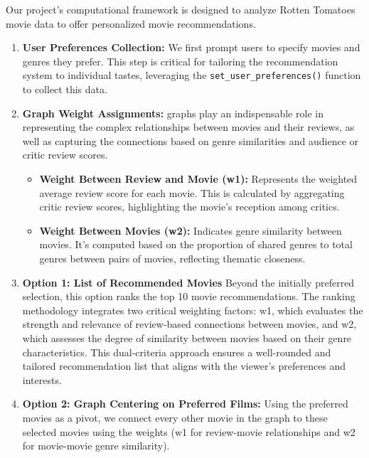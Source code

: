 \documentclass[fontsize=11pt]{article}
\begin{document}
Our project's computational framework is designed to analyze Rotten Tomatoes movie data to offer personalized movie recommendations.

\begin{enumerate}
    \item \textbf{User Preferences Collection:} We first prompt users to specify movies and genres they prefer. This step is critical for tailoring the recommendation system to individual tastes, leveraging the \texttt{set\_user\_preferences()} function to collect this data.
    
    \item \textbf{Graph Weight Assignments:} graphs play an indispensable role in representing the complex relationships between movies and their reviews, as well as capturing the connections based on genre similarities and audience or critic review scores. 
    \begin{itemize}
        \item \textbf{Weight Between Review and Movie (w1):} Represents the weighted average review score for each movie. This is calculated by aggregating critic review scores, highlighting the movie's reception among critics.
        \item \textbf{Weight Between Movies (w2):} Indicates genre similarity between movies. It's computed based on the proportion of shared genres to total genres between pairs of movies, reflecting thematic closeness.
    \end{itemize}

    \item \textbf{Option 1: List of Recommended Movies} Beyond the initially preferred selection, this option ranks the top 10 movie recommendations. The ranking methodology integrates two critical weighting factors: w1, which evaluates the strength and relevance of review-based connections between movies, and w2, which assesses the degree of similarity between movies based on their genre characteristics. This dual-criteria approach ensures a well-rounded and tailored recommendation list that aligns with the viewer's preferences and interests.
    
    \item \textbf{Option 2: Graph Centering on Preferred Films:} Using the preferred movies as a pivot, we connect every other movie in the graph to these selected movies using the weights (w1 for review-movie relationships and w2 for movie-movie genre similarity).
    \vspace{0.5cm}


\end{enumerate}
\end{document}
